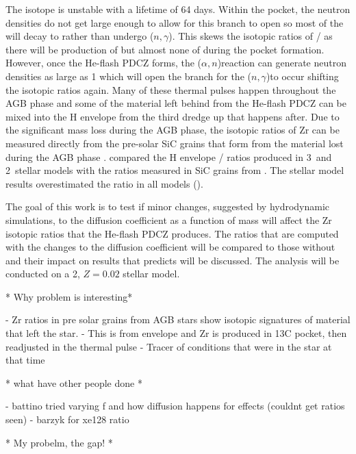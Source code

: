 \documentclass[fleqn,usenatbib]{mnras}
\begin{document}
The \zirconium[95] isotope is unstable with a lifetime of 64 days. Within the \carbon[13] pocket, the neutron densities do not get large enough to allow for this branch to open so most of the \zirconium[95] will decay to \molybdenum[95] rather than undergo \zirconium[95]($n,\gamma$)\zirconium[96]. This skews the isotopic ratios of \zirconium[96] / \zirconium[94] as there will be production of \zirconium[94] but almost none of \zirconium[96] during the \carbon[13] pocket formation. However, once the He-flash PDCZ forms, the \neon[22]($\alpha,n$)\magnesium[25] reaction can generate neutron densities as large as 1  which will open the branch for the \zirconium[95]($n,\gamma$)\zirconium[96] to occur shifting the isotopic ratios again. Many of these thermal pulses happen throughout the AGB phase and some of the material left behind from the He-flash PDCZ can be mixed into the H envelope from the third dredge up that happens after. Due to the significant mass loss during the AGB phase, the isotopic ratios of Zr can be measured directly from the pre-solar SiC grains that form from the material lost during the AGB phase \citep{grain}. \citet{zr} compared the H envelope \zirconium[96] / \zirconium[94] ratios produced in 3\Msun~and 2\Msun~stellar models with the ratios measured in SiC grains from \citet{grain}. The stellar model results overestimated the ratio in all models ().

The goal of this work is to test if minor changes, suggested by hydrodynamic simulations, to the diffusion coefficient as a function of mass will affect the Zr isotopic ratios that the He-flash PDCZ produces. The ratios that are computed with the changes to the diffusion coefficient will be compared to those without and their impact on results that \citep{zr} predicts will be discussed. The analysis will be conducted on a 2\Msun, $Z=0.02$ stellar model.

* Why problem is interesting*

- Zr ratios in pre solar grains from AGB stars show isotopic signatures of material that left the star. 
- This is from envelope and Zr is produced in 13C pocket, then readjusted in the thermal pulse
- Tracer of conditions that were in the star at that time

* what have other people done *

- battino tried varying f and how diffusion happens for effects (couldnt get ratios seen)
- barzyk for xe128 ratio 

* My probelm, the gap! *
\end{document}
